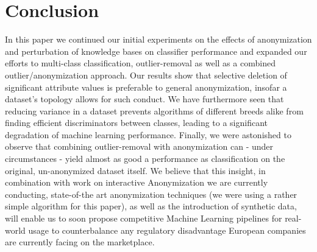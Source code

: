 \documentclass{llncs}
\begin{document}
\section{Conclusion}
\label{sect:conclusion}

In this paper we continued our initial experiments on the effects of anonymization and perturbation of knowledge bases on classifier performance and expanded our efforts to multi-class classification, outlier-removal as well as a combined outlier/anonymization approach. Our results show that selective deletion of significant attribute values is preferable to general anonymization, insofar a dataset's topology allows for such conduct. We have furthermore seen that reducing variance in a dataset prevents algorithms of different breeds alike from finding efficient discriminators between classes, leading to a significant degradation of machine learning performance. Finally, we were astonished to observe that combining outlier-removal with anonymization can - under circumstances - yield almost as good a performance as classification on the original, un-anonymized dataset itself. We believe that this insight, in combination with work on interactive Anonymization we are currently conducting, state-of-the art anonymization techniques (we were using a rather simple algorithm for this paper), as well as the introduction of synthetic data, will enable us to soon propose competitive Machine Learning pipelines for real-world usage to counterbalance any regulatory disadvantage European companies are currently facing on the marketplace.

\clearpage
\newpage



\end{document}
